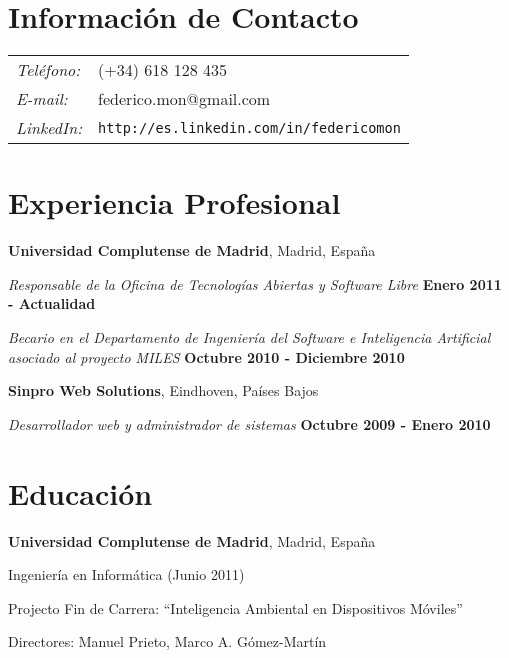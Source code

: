 \documentclass[margin,line]{resume}
\begin{document}

\begin{resume}
\section{\sc Información de Contacto}
\vspace{.05in}
\begin{tabular}{@{}p{0.5in}p{2in}}
{\it Teléfono:} &(+34) 618 128 435 \\
{\it E-mail:} &{ federico.mon@gmail.com}\\
{\it LinkedIn:} &{ \tt http://es.linkedin.com/in/federicomon}\\
\end{tabular}

\section{\sc Experiencia Profesional}
{\bf Universidad Complutense de Madrid}, Madrid, España

\vspace{-.3cm}
{\em Responsable de la Oficina de Tecnologías Abiertas y Software Libre} \hfill {\bf Enero 2011 - Actualidad
}

\vspace{-.3cm}
{\em Becario en el Departamento de Ingeniería del Software e Inteligencia Artificial asociado al proyecto MILES} \hfill {\bf Octubre 2010 -
Diciembre 2010}


{\bf Sinpro Web Solutions}, Eindhoven, Países Bajos

\vspace{-.3cm}
{\em Desarrollador web y administrador de sistemas} \hfill {\bf Octubre 2009 -
Enero 2010}

\section{\sc Educación}
{\bf Universidad Complutense de Madrid}, Madrid, España\\
\vspace*{-.1in}
\begin{list1}
\item[] Ingeniería en Informática (Junio 2011)
\begin{list2}
\vspace*{.05in}
\item Projecto Fin de Carrera:  ``Inteligencia Ambiental en Dispositivos Móviles'' 
\item Directores:  Manuel Prieto, Marco A. Gómez-Martín
\end{list2}
\end{list1}



\end{resume}
\end{document}
